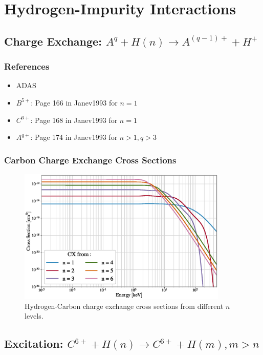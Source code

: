 \section{Hydrogen-Impurity Interactions}
\subsection{Charge Exchange: $A^{q} + H(n) \rightarrow A^{(q-1)+} + H^+$}
\subsubsection{References}
\begin{itemize}
    \item ADAS\cite{adas}
    \item $B^{5+}$: Page 166 in Janev1993\cite{janev1993cross} for $n=1$
    \item $C^{6+}$: Page 168 in Janev1993\cite{janev1993cross} for $n=1$
    \item $A^{q+}$: Page 174 in Janev1993\cite{janev1993cross} for $n>1,q>3$
\end{itemize}
\subsubsection{Carbon Charge Exchange Cross Sections}
\begin{figure}[h!]
    \centering
    \includegraphics[width=10cm]{figures/tables/H_C6_cx.eps}
    \caption{Hydrogen-Carbon charge exchange cross sections from different $n$ levels.}
    \label{fig:H_C6_CX}
\end{figure}
\newpage

\subsection{Excitation: $C^{6+} + H(n) \rightarrow C^{6+} + H(m), m > n$}

